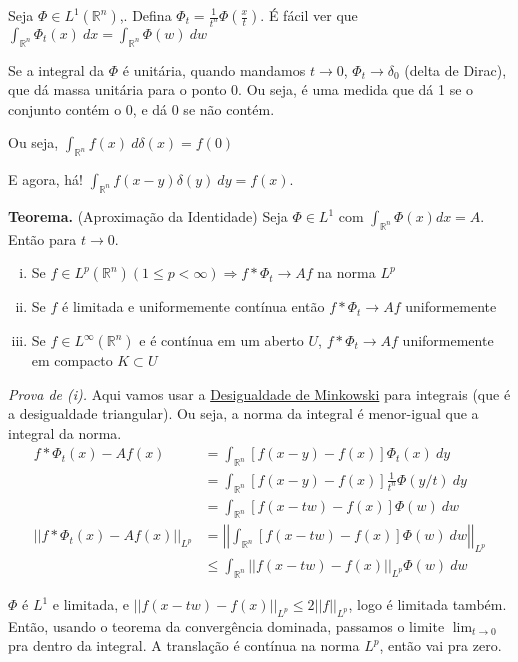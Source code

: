 \documentclass[11pt]{article}
\newcommand{\Rn}{{\mathbb{R}^n}}
\newcommand{\norm}[2]{\left|\left|#1\right|\right|_{L^{#2}}}
\begin{document}
Seja \(\Phi \in L^1(\Rn)\),. Defina \( \Phi_t = \frac{1}{t^n} \Phi(\frac{x}{t}) \). É fácil ver que \(\int_{\mathbb{R}^n} \Phi_t(x)\ dx = \int_{\mathbb{R}^n} \Phi(w)\ dw \)

Se a integral da \(\Phi\) é unitária, quando mandamos \(t \rightarrow 0 \), \(\Phi_t \rightarrow \delta_0\) (delta de Dirac), que dá massa unitária para o ponto \(0\). Ou seja, é uma medida que dá 1 se o conjunto contém o 0, e dá 0 se não contém.

Ou seja, \(\int_\Rn f(x)\ d\delta(x) = f(0)\)

E agora, há! \(\int_\Rn f(x-y) \delta(y) \ dy = f(x)\). 

\textbf{Teorema.} (Aproximação da Identidade) Seja \(\Phi \in L^1\) com \(\int_{\mathbb{R}^n} \Phi(x)dx = A \). Então para \(t\rightarrow 0 \).

\begin{enumerate}[(i)]
	\item Se \(f \in L^p (\mathbb{R}^n) (1\leq p < \infty) \Rightarrow f * \Phi_t \rightarrow Af \) na norma \(L^p\)
	\item Se \(f\) é limitada e uniformemente contínua então \( f * \Phi_t \rightarrow Af \) uniformemente 
	\item Se \( f \in L^\infty (\mathbb{R}^n)\) e é contínua em um aberto \(U\), \( f * \Phi_t \rightarrow Af \) uniformemente em compacto \( K \subset U\)
	
\end{enumerate}

\textit{Prova de (i).} Aqui vamos usar a \href{https://en.wikipedia.org/wiki/Minkowski_inequality}{Desigualdade de Minkowski} para integrais (que é a desigualdade triangular). Ou seja, a norma da integral é menor-igual que a integral da norma. \begin{align*}
	f * \Phi_t (x) - Af(x) &= \int_\Rn \left[ f(x-y) - f(x) \right] \Phi_t(x)\ dy \\
	&= \int_\Rn \left[ f(x - y) - f(x) \right] \frac{1}{t^n}\Phi(y/t)\ dy \\
	&= \int_\Rn \left[ f(x - tw) - f(x) \right] \Phi(w)\ dw \\
	\norm{f * \Phi_t (x) - Af(x)}{p} &= \norm{\int_\Rn \left[ f(x - tw) - f(x) \right] \Phi(w)\ dw}{p} \\
	&\leq \int_\Rn \norm{f(x - tw) - f(x)}{p} \Phi(w) \ dw
\end{align*}

\(\Phi\) é \(L^1\) e limitada, e \(\norm{f(x - tw) - f(x)}{p} \leq 2 \norm{f}{p}\), logo é limitada também. Então, usando o teorema da convergência dominada, passamos o limite \(\lim_{t \rightarrow0}\) pra dentro da integral. A translação é contínua na norma \(L^p\), então vai pra zero.
\end{document}
